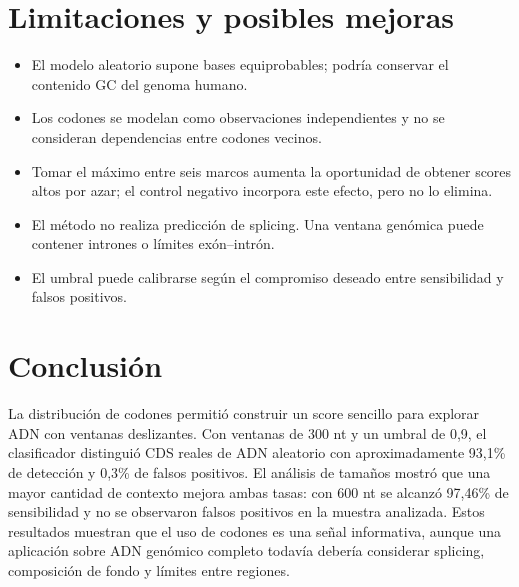 \documentclass[11pt,a4paper]{article}
\begin{document}
\section{Limitaciones y posibles mejoras}

\begin{itemize}
    \item El modelo aleatorio supone bases equiprobables; podría conservar el contenido GC del genoma humano.
    \item Los codones se modelan como observaciones independientes y no se consideran dependencias entre codones vecinos.
    \item Tomar el máximo entre seis marcos aumenta la oportunidad de obtener scores altos por azar; el control negativo incorpora este efecto, pero no lo elimina.
    \item El método no realiza predicción de splicing. Una ventana genómica puede contener intrones o límites exón--intrón.
    \item El umbral puede calibrarse según el compromiso deseado entre sensibilidad y falsos positivos.
\end{itemize}

\section{Conclusión}

La distribución de codones permitió construir un score sencillo para explorar ADN con ventanas deslizantes. Con ventanas de 300 nt y un umbral de 0,9, el clasificador distinguió CDS reales de ADN aleatorio con aproximadamente 93,1\% de detección y 0,3\% de falsos positivos. El análisis de tamaños mostró que una mayor cantidad de contexto mejora ambas tasas: con 600 nt se alcanzó 97,46\% de sensibilidad y no se observaron falsos positivos en la muestra analizada. Estos resultados muestran que el uso de codones es una señal informativa, aunque una aplicación sobre ADN genómico completo todavía debería considerar splicing, composición de fondo y límites entre regiones.
\end{document}
